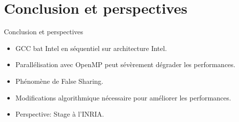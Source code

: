 \documentclass{beamer}
\begin{document}
\section{Conclusion et perspectives}

\begin{frame}{Conclusion et perspectives}
\begin{itemize}
\item
	GCC bat Intel en séquentiel sur architecture Intel.
	\item
	Parallélisation avec OpenMP peut sévèrement dégrader les performances.
  \item
    Phénomène de False Sharing.
  \item
  	Modifications algorithmique nécessaire pour améliorer les performances.
  \item
  	Perspective: Stage à l'\textsc{INRIA}.
 \end{itemize}	
\end{frame}
\end{document}

